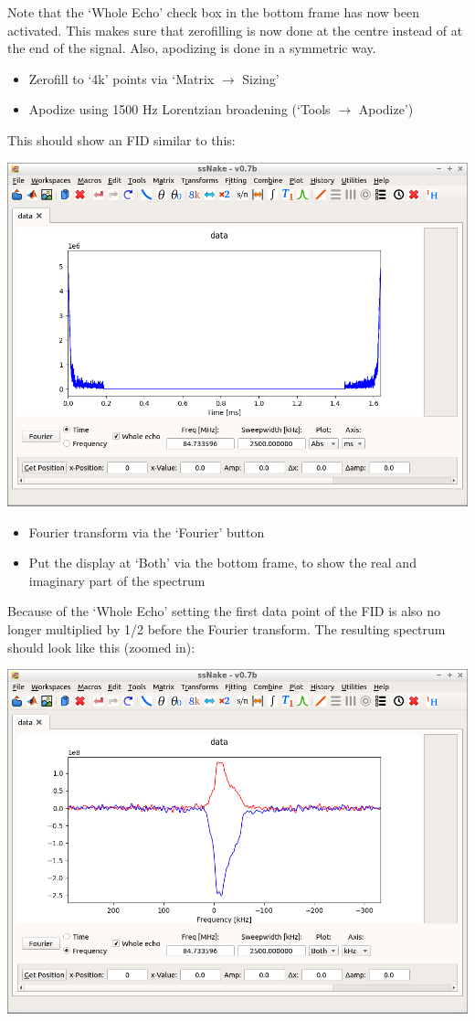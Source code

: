 \documentclass[11pt,a4paper]{article}
\begin{document}
Note that the `Whole Echo' check box in the bottom frame has now been activated.
This makes sure that zerofilling is now done at the centre instead of at the end of the signal.
Also, apodizing is done in a symmetric way.
\begin{itemize}
\item Zerofill to `4k' points via `Matrix $\longrightarrow$ Sizing' 
\item Apodize using 1500 Hz Lorentzian broadening (`Tools  $\longrightarrow$ Apodize')
\end{itemize}
This should show an FID similar to this:
\begin{center}
\includegraphics[width=0.8\linewidth]{Figs/Fig2.png}
\end{center}

\begin{itemize}
\item Fourier transform via the `Fourier' button
\item Put the display at `Both' via the bottom frame, to show the real and imaginary part of the spectrum
\end{itemize}
Because of the `Whole Echo' setting the first data point of the FID is also no longer multiplied by 1/2 before the Fourier transform.
The resulting spectrum should look like this (zoomed in):
\begin{center}
\includegraphics[width=0.8\linewidth]{Figs/Fig3.png}
\end{center}
\end{document}
